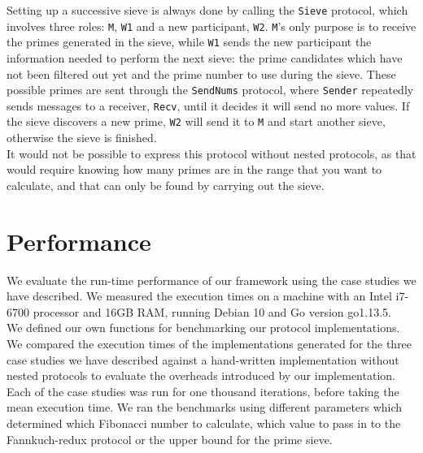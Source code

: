 \documentclass[12pt,twoside]{report}
\begin{document}
Setting up a successive sieve is always done by calling the \texttt{Sieve} protocol, which involves three roles: \texttt{M}, \texttt{W1} and a new participant, \texttt{W2}. \texttt{M}'s only purpose is to receive the primes generated in the sieve, while \texttt{W1} sends the new participant the information needed to perform the next sieve: the prime candidates which have not been filtered out yet and the prime number to use during the sieve. These possible primes are sent through the \texttt{SendNums} protocol, where \texttt{Sender} repeatedly sends messages to a receiver, \texttt{Recv}, until it decides it will send no more values. If the sieve discovers a new prime, \texttt{W2} will send it to \texttt{M} and start another sieve, otherwise the sieve is finished.\\

It would not be possible to express this protocol without nested protocols, as that would require knowing how many primes are in the range that you want to calculate, and that can only be found by carrying out the sieve. 

\section{Performance}\label{performance}

We evaluate the run-time performance of our framework using the case studies we have described. We measured the execution times on a machine with an Intel i7-6700 processor and 16GB RAM, running Debian 10 and Go version go1.13.5. \\


We defined our own functions for benchmarking our protocol implementations. We compared the execution times of the implementations generated for the three case studies we have described against a hand-written implementation without nested protocols to evaluate the overheads introduced by our implementation. Each of the case studies was run for one thousand iterations, before taking the mean execution time. We ran the benchmarks using different parameters which determined which Fibonacci number to calculate, which value to pass in to the Fannkuch-redux protocol or the upper bound for the prime sieve.\\
\end{document}
